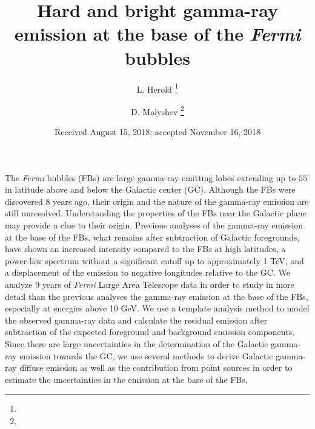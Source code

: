 \documentclass[onecolumn, 12pt]{aa}
\newcommand{\Fermi}{\textsl{Fermi}\xspace}
\begin{document}
 


   \title{Hard and bright gamma-ray emission at the base of the \Fermi bubbles}



   \author{L. Herold \thanks{}
          \and
          D. Malyshev \thanks{}
          }


   \date{Received August 15, 2018; accepted November 16, 2018}

 
\abstract
{The \Fermi bubbles (FBs) are large gamma-ray emitting lobes extending up to $55^\circ$ in latitude above and below the Galactic center (GC).
Although the FBs were discovered 8 years ago, their origin and the nature of the gamma-ray emission are still unresolved.
Understanding the properties of the FBs near the Galactic plane may provide a clue to their origin.
Previous analyses of the gamma-ray emission at the base of the FBs, what remains after subtraction of Galactic foregrounds,
have shown an increased intensity compared to the FBs at high latitudes,
a power-law spectrum without a significant cutoff up to approximately 1 TeV,
and a displacement of the emission to negative longitudes relative to the GC.
}
{We analyze 9 years of  \Fermi Large Area Telescope data in order to study in more detail than the previous analyses
the gamma-ray emission at the base of the FBs,
especially at energies above 10 GeV.
}
{ We use a template analysis method to model the observed gamma-ray data
and calculate the residual emission after subtraction of the expected foreground and background emission components.
Since there are large uncertainties in the determination of the Galactic gamma-ray emission towards the GC,
we use several methods to derive Galactic gamma-ray diffuse emission as well as the contribution from point sources
in order to estimate the uncertainties in the emission at the base of the FBs.
}
\end{document}

